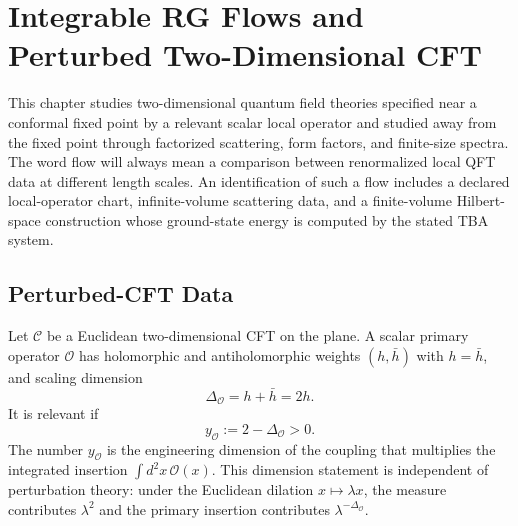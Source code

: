 \chapter{Integrable RG Flows and Perturbed Two-Dimensional CFT}
\label{ch:integrable-rg-flows-perturbed-cft}

\ConventionsMixedCFT

This chapter studies two-dimensional quantum field theories specified near a
conformal fixed point by a relevant scalar local operator and studied away
from the fixed point through factorized scattering, form factors, and
finite-size spectra.  The word flow will always mean a comparison between
renormalized local QFT data at different length scales.  An identification of
such a flow includes a declared local-operator chart, infinite-volume
scattering data, and a finite-volume Hilbert-space construction whose
ground-state energy is computed by the stated TBA system.

\section{Perturbed-CFT Data}

Let \(\mathcal C\) be a Euclidean two-dimensional CFT on the plane.  A scalar
primary operator \(\mathcal O\) has holomorphic and antiholomorphic weights
\((h,\bar h)\) with \(h=\bar h\), and scaling dimension
\[
  \Delta_{\mathcal O}=h+\bar h=2h .
\]
It is relevant if
\[
  y_{\mathcal O}:=2-\Delta_{\mathcal O}>0 .
\]
The number \(y_{\mathcal O}\) is the engineering dimension of the coupling
that multiplies the integrated insertion \(\int d^2x\,\mathcal O(x)\).  This
dimension statement is independent of perturbation theory: under the Euclidean
dilation \(x\mapsto \lambda x\), the measure contributes \(\lambda^2\) and
the primary insertion contributes \(\lambda^{-\Delta_{\mathcal O}}\).

